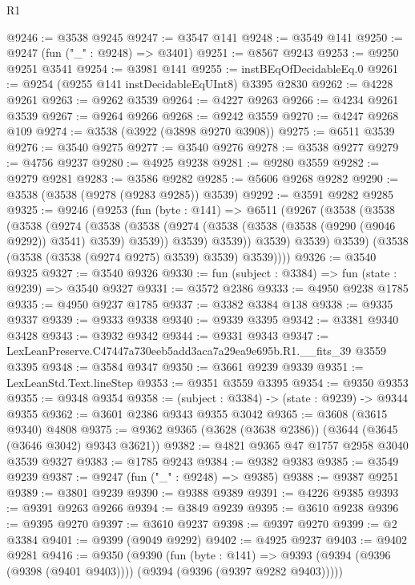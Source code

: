 \begin{lexlean}{R1}
\begin{coremodule}
@9246 := @3538 @9245
@9247 := @3547 @141
@9248 := @3549 @141
@9250 := @9247 (fun ("_" : @9248) => @3401)
@9251 := @8567 @9243
@9253 := @9250 @9251 @3541
@9254 := @3981 @141
@9255 := instBEqOfDecidableEq.{0}
@9261 := @9254 (@9255 @141 instDecidableEqUInt8) @3395 @2830
@9262 := @4228 @9261
@9263 := @9262 @3539
@9264 := @4227 @9263
@9266 := @4234 @9261 @3539
@9267 := @9264 @9266
@9268 := @9242 @3559
@9270 := @4247 @9268 @109
@9274 := @3538 (@3922 (@3898 @9270 @3908))
@9275 := @6511 @3539
@9276 := @3540 @9275
@9277 := @3540 @9276
@9278 := @3538 @9277
@9279 := @4756 @9237
@9280 := @4925 @9238
@9281 := @9280 @3559
@9282 := @9279 @9281
@9283 := @3586 @9282
@9285 := @5606 @9268 @9282
@9290 := @3538 (@3538 (@9278 (@9283 @9285)) @3539)
@9292 := @3591 @9282 @9285
@9325 := @9246
    (@9253
      (fun (byte : @141) =>
      @6511
        (@9267
          (@3538
            (@3538
              (@3538
                (@9274
                  (@3538
                    (@3538
                      (@9274 (@3538 (@3538 (@3538 (@9290 (@9046 @9292)) @3541) @3539) @3539))
                      @3539)
                    @3539))
                @3539)
              @3539)
            @3539)
          (@3538 (@3538 (@3538 (@9274 @9275) @3539) @3539) @3539))))
@9326 := @3540 @9325
@9327 := @3540 @9326
@9330 := fun (subject : @3384) => fun (state : @9239) => @3540 @9327
@9331 := @3572 @2386
@9333 := @4950 @9238 @1785
@9335 := @4950 @9237 @1785
@9337 := @3382 @3384 @138
@9338 := @9335 @9337
@9339 := @9333 @9338
@9340 := @9339 @3395
@9342 := @3381 @9340 @3428
@9343 := @3932 @9342
@9344 := @9331 @9343
@9347 := LexLeanPreserve.C47447a730eeb5add3aca7a29ea9e695b.R1.__fits_39 @3559 @3395
@9348 := @3584 @9347
@9350 := @3661 @9239 @9339
@9351 := LexLeanStd.Text.lineStep
@9353 := @9351 @3559 @3395
@9354 := @9350 @9353
@9355 := @9348 @9354
@9358 := (subject : @3384) -> (state : @9239) -> @9344 @9355
@9362 := @3601 @2386 @9343 @9355 @3042
@9365 := @3608 (@3615 @9340) @4808
@9375 := @9362 @9365 (@3628 (@3638 @2386)) (@3644 (@3645 (@3646 @3042) @9343 @3621))
@9382 := @4821 @9365 @47 @1757 @2958 @3040 @3539 @9327
@9383 := @1785 @9243
@9384 := @9382 @9383
@9385 := @3549 @9239
@9387 := @9247 (fun ("_" : @9248) => @9385)
@9388 := @9387 @9251
@9389 := @3801 @9239
@9390 := @9388 @9389
@9391 := @4226 @9385
@9393 := @9391 @9263 @9266
@9394 := @3849 @9239
@9395 := @3610 @9238
@9396 := @9395 @9270
@9397 := @3610 @9237
@9398 := @9397 @9270
@9399 := @2 @3384
@9401 := @9399 (@9049 @9292)
@9402 := @4925 @9237
@9403 := @9402 @9281
@9416 := @9350
    (@9390
      (fun (byte : @141) =>
      @9393 (@9394 (@9396 (@9398 (@9401 @9403)))) (@9394 (@9396 (@9397 @9282 @9403)))))

\end{coremodule}
\end{lexlean}
